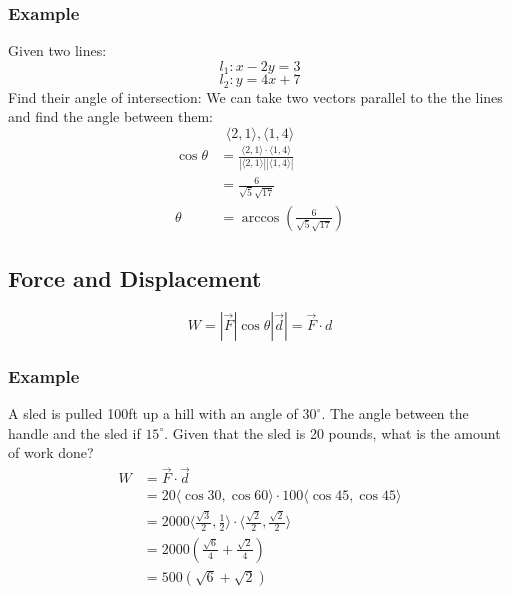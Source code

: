 \documentclass[letterpaper, 12pt]{math}
\begin{document}
\subsubsection*{Example}
Given two lines:
\[ l_{1}: x-2y = 3 \]
\[ l_{2}: y = 4x+7 \]
Find their angle of intersection:
We can take two vectors parallel to the the lines and find the angle between
them:
\[ \langle2,1\rangle, \langle1,4\rangle \]
\begin{align*}
  \cos\theta &= \frac{\langle2,1\rangle\cdot\langle1,4\rangle}
    {|\langle2,1\rangle||\langle1,4\rangle|} \\
  &= \frac{6}{\sqrt{5}\sqrt{17}} \\
  \theta &= \arccos(\frac{6}{\sqrt{5}\sqrt{17}})
\end{align*}

\subsection*{Force and Displacement}
\begin{center}
\end{center}
\[ W = |\vec{F}|\cos\theta|\vec{d}| = \vec{F}\cdot{d} \]

\subsubsection*{Example}
A sled is pulled 100ft up a hill with an angle of \( 30^{\circ} \). The angle
between the handle and the sled if \( 15^{\circ} \). Given that the sled is 20
pounds, what is the amount of work done?
\begin{align*}
  W &= \vec{F}\cdot\vec{d} \\
  &= 20\langle\cos30,\cos60\rangle\cdot100\langle\cos45,\cos45\rangle \\
  &= 2000\langle\frac{\sqrt{3}}{2},\frac{1}{2}\rangle
    \cdot\langle\frac{\sqrt{2}}{2},\frac{\sqrt{2}}{2}\rangle \\
  &= 2000(\frac{\sqrt{6}}{4}+\frac{\sqrt{2}}{4}) \\
  &= 500(\sqrt{6}+\sqrt{2})
\end{align*}
\end{document}
